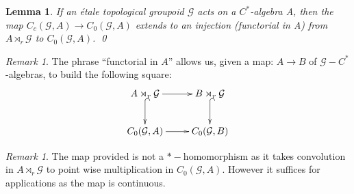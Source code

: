 \documentclass[11pt]{amsart}
\theoremstyle{plain}
\newtheorem{lemma}[theorem]{Lemma}%
\theoremstyle{definition}%
\theoremstyle{remark}%
\newtheorem{remark}[theorem]{Remark}%
\newcommand{\G}{\mathcal{G}}
\begin{document}
\begin{lemma}\label{Lem:Lemma9}\cite[Lemma 9]{MR1911663}
If an \'etale topological groupoid $\G$ acts on a $C^{*}$-algebra A, then the map $C_{c}(\G,A) \rightarrow C_{0}(\G,A)$ extends to an injection (functorial in A) from $A\rtimes_{r} \G$ to $C_{0}(\G,A)$. \qed
\end{lemma}

\begin{remark}
The phrase ``functorial in $A$'' allows us, given a map: $A \rightarrow B$ of $\G-C^{*}$-algebras, to build the following square:
\begin{equation*}
\xymatrix{A\rtimes_{r} \G \ar@{->}[r] \ar@{^{(}->}[d] &B \rtimes_{r} \G \ar@{^{(}->}[d]\\
C_{0}(\G ,A)\ar@{->}[r] &   C_{0}(\G ,B)
}
\end{equation*}
\end{remark}

\begin{remark}
The map provided is not a $*-$homomorphism as it takes convolution in $A\rtimes_{r} \G$ to point wise multiplication in $C_{0}(\G,A)$. However it suffices for applications as the map is continuous.
\end{remark}
\end{document}
